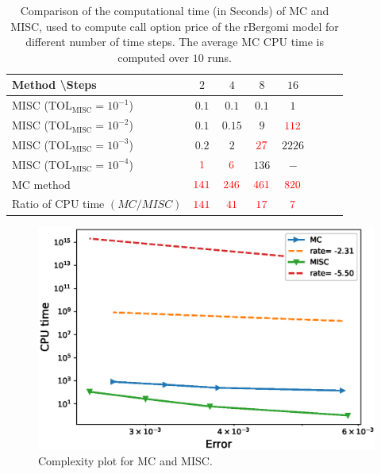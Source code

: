 \FloatBarrier
\begin{table}[h!]
	\centering
	\begin{tabular}{l*{6}{c}r}
		Method \textbackslash  Steps            & $2$ & $4$ & $8$ & $16$ &   \\
		\hline
		MISC ($\text{TOL}_{\text{MISC}}=10^{-1}$)  & $0.1$ & $0.1$ & $0.1$ & $1$ \\
		MISC ($\text{TOL}_{\text{MISC}}=10^{-2}$)  & $0.1$ & $0.15$ & $9$ & $\red{112}$ \\
		MISC ($\text{TOL}_{\text{MISC}}=10^{-3}$)  & $0.2$ & $2$ & $\red{27}$ & $2226$ \\
		MISC ($\text{TOL}_{\text{MISC}}=10^{-4}$)  & $\red{1}$ & $\red{6}$ & $136$ & $-$\\
		\hline
		MC method   & $ \red{141}
		
		$  & $  \red{246}$  & $  \red{461}$ & $ \red{820}
		$  \\	
		\hline
		Ratio of CPU time  $\left(MC/MISC \right)$ & $ \red{141}
		
		$  & $  \red{
			41
		}$  & $  \red{    17
		}$ & $ \red{ 7}
		$  \\	
%		
		\hline
	\end{tabular}
	\caption{Comparison of the computational time (in Seconds) of  MC and MISC, used to compute call option price of the rBergomi model for different number of time steps. The average  MC CPU time is computed over $10$ runs. }
	\label{Comparsion of the computational time of  MC and MISC, used to compute Call option price of rBergomi model for different number of time steps. Case set4}
\end{table}


\FloatBarrier

	\begin{figure}[h!]
	\centering
	\includegraphics[width=0.5\linewidth]{./figures/rBergomi_Complexity_rates/set6/error_vs_time_set6}
	
	\caption{Complexity plot for MC and MISC.}
	\label{fig:Complexity plot for MC and MISC for case set $4$ parameters}
\end{figure}
\FloatBarrier
